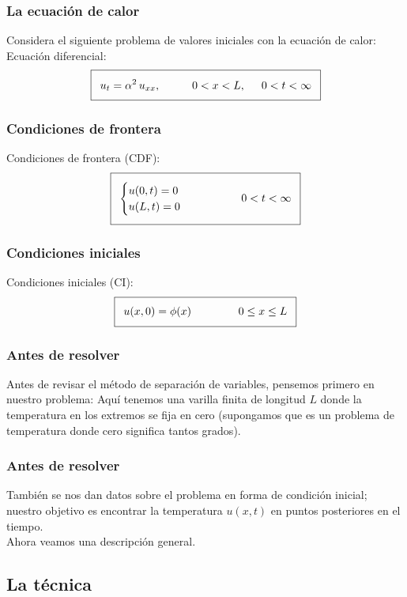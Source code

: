 \documentclass[12pt]{beamer}
\begin{document}
\begin{frame}
\frametitle{La ecuación de calor}
Considera el siguiente problema de valores iniciales con la ecuación de calor:
\\
\bigskip
\pause
Ecuación diferencial:
\begin{align*}
\addtolength{\fboxsep}{5pt}\boxed{ u_{t} = \alpha^{2} \, u_{xx}, \hspace{1cm} 0 < x < L,\hspace{0.5cm} 0 < t < \infty}
\end{align*}
\end{frame}
\begin{frame}
\frametitle{Condiciones de frontera}
Condiciones de frontera (CDF):
\begin{align*}
\addtolength{\fboxsep}{5pt}\boxed{
\begin{cases}
u(0, t) = 0 \\
u(L, t) = 0
\end{cases}
\hspace{1.5cm}
0 < t < \infty }
\end{align*}
\end{frame}
\begin{frame}
\frametitle{Condiciones iniciales}
Condiciones iniciales (CI):
\begin{align*}
\addtolength{\fboxsep}{5pt}\boxed{
u(x, 0) = \phi (x) \hspace{1.5cm} 0 \leq x \leq L
}
\end{align*}
\end{frame}
\begin{frame}
\frametitle{Antes de resolver}
Antes de revisar el método de separación de variables, pensemos primero en nuestro problema: Aquí tenemos una varilla finita de longitud $L$ donde la temperatura en los extremos se fija en cero (supongamos que es un problema de temperatura donde cero significa tantos grados).
\end{frame}
\begin{frame}
\frametitle{Antes de resolver}
También se nos dan datos sobre el problema en forma de condición inicial; nuestro objetivo es encontrar la temperatura $u (x, t)$ en puntos posteriores en el tiempo.
\\
\bigskip
\pause
Ahora veamos una descripción general.
\end{frame}

\subsection{La técnica}
\end{document}
